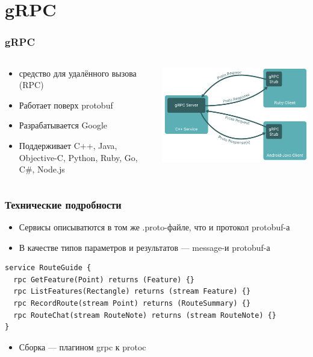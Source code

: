 \documentclass[xetex,mathserif,serif]{beamer}
\begin{document}
	\section{gRPC}

	\begin{frame}
		\frametitle{gRPC}
		\begin{columns}
			\begin{column}{0.6\textwidth}
				\begin{itemize}
					\item средство для удалённого вызова (RPC)
					\item Работает поверх protobuf
					\item Разрабатывается Google
					\item Поддерживает C++, Java, Objective-C, Python, Ruby, Go, C\#, Node.js
				\end{itemize}
			\end{column}
			\begin{column}{0.4\textwidth}
				\begin{center}
					\includegraphics[width=\textwidth]{grpc.png}
				\end{center}
			\end{column}
		\end{columns}
	\end{frame}

	\begin{frame}[fragile]
		\frametitle{Технические подробности}
		\begin{itemize}
			\item Сервисы описыватются в том же .proto-файле, что и протокол protobuf-а
			\item В качестве типов параметров и результатов --- message-и protobuf-а
		\end{itemize}
		\begin{verbatim}
service RouteGuide {
  rpc GetFeature(Point) returns (Feature) {}
  rpc ListFeatures(Rectangle) returns (stream Feature) {}
  rpc RecordRoute(stream Point) returns (RouteSummary) {}
  rpc RouteChat(stream RouteNote) returns (stream RouteNote) {}
}
		\end{verbatim}
		\begin{itemize}
			\item Сборка --- плагином grpc к protoc
		\end{itemize}
\end{frame}
\end{document}
